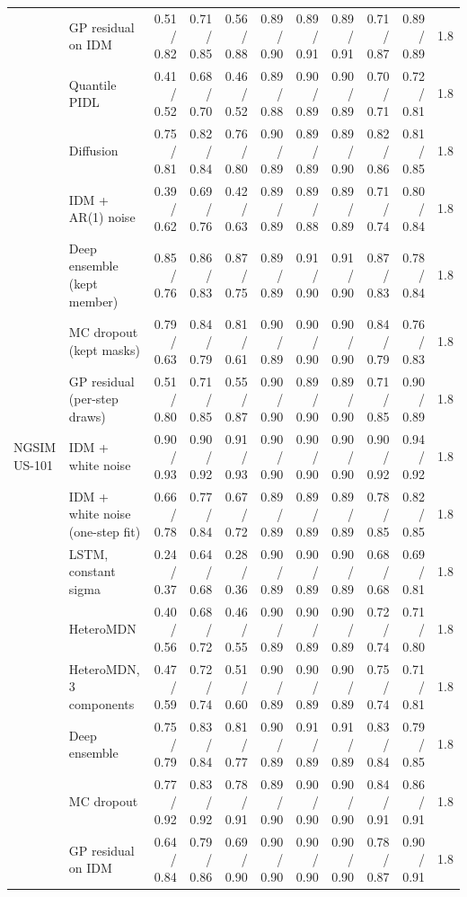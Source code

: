 \begin{longtable}{llrrrrrrrrr}
 & GP residual on IDM & 0.51 / 0.82 & 0.71 / 0.85 & 0.56 / 0.88 & 0.89 / 0.90 & 0.89 / 0.91 & 0.89 / 0.91 & 0.71 / 0.87 & 0.89 / 0.89 & 1.8 \\
 & Quantile PIDL & 0.41 / 0.52 & 0.68 / 0.70 & 0.46 / 0.52 & 0.89 / 0.88 & 0.90 / 0.89 & 0.90 / 0.89 & 0.70 / 0.71 & 0.72 / 0.81 & 1.8 \\
 & Diffusion & 0.75 / 0.81 & 0.82 / 0.84 & 0.76 / 0.80 & 0.90 / 0.89 & 0.89 / 0.89 & 0.89 / 0.90 & 0.82 / 0.86 & 0.81 / 0.85 & 1.8 \\
 & IDM + AR(1) noise & 0.39 / 0.62 & 0.69 / 0.76 & 0.42 / 0.63 & 0.89 / 0.89 & 0.89 / 0.88 & 0.89 / 0.89 & 0.71 / 0.74 & 0.80 / 0.84 & 1.8 \\
 & Deep ensemble (kept member) & 0.85 / 0.76 & 0.86 / 0.83 & 0.87 / 0.75 & 0.89 / 0.89 & 0.91 / 0.90 & 0.91 / 0.90 & 0.87 / 0.83 & 0.78 / 0.84 & 1.8 \\
 & MC dropout (kept masks) & 0.79 / 0.63 & 0.84 / 0.79 & 0.81 / 0.61 & 0.90 / 0.89 & 0.90 / 0.90 & 0.90 / 0.90 & 0.84 / 0.79 & 0.76 / 0.83 & 1.8 \\
 & GP residual (per-step draws) & 0.51 / 0.80 & 0.71 / 0.85 & 0.55 / 0.87 & 0.90 / 0.90 & 0.89 / 0.90 & 0.89 / 0.90 & 0.71 / 0.85 & 0.90 / 0.89 & 1.8 \\
\midrule
NGSIM US-101 & IDM + white noise & 0.90 / 0.93 & 0.90 / 0.92 & 0.91 / 0.93 & 0.90 / 0.90 & 0.90 / 0.90 & 0.90 / 0.90 & 0.90 / 0.92 & 0.94 / 0.92 & 1.8 \\
 & IDM + white noise (one-step fit) & 0.66 / 0.78 & 0.77 / 0.84 & 0.67 / 0.72 & 0.89 / 0.89 & 0.89 / 0.89 & 0.89 / 0.89 & 0.78 / 0.85 & 0.82 / 0.85 & 1.8 \\
 & LSTM, constant sigma & 0.24 / 0.37 & 0.64 / 0.68 & 0.28 / 0.36 & 0.90 / 0.89 & 0.90 / 0.89 & 0.90 / 0.89 & 0.68 / 0.68 & 0.69 / 0.81 & 1.8 \\
 & HeteroMDN & 0.40 / 0.56 & 0.68 / 0.72 & 0.46 / 0.55 & 0.90 / 0.89 & 0.90 / 0.89 & 0.90 / 0.89 & 0.72 / 0.74 & 0.71 / 0.80 & 1.8 \\
 & HeteroMDN, 3 components & 0.47 / 0.59 & 0.72 / 0.74 & 0.51 / 0.60 & 0.90 / 0.89 & 0.90 / 0.89 & 0.90 / 0.89 & 0.75 / 0.74 & 0.71 / 0.81 & 1.8 \\
 & Deep ensemble & 0.75 / 0.79 & 0.83 / 0.84 & 0.81 / 0.77 & 0.90 / 0.89 & 0.91 / 0.89 & 0.91 / 0.89 & 0.83 / 0.84 & 0.79 / 0.85 & 1.8 \\
 & MC dropout & 0.77 / 0.92 & 0.83 / 0.92 & 0.78 / 0.91 & 0.89 / 0.90 & 0.90 / 0.90 & 0.90 / 0.90 & 0.84 / 0.91 & 0.86 / 0.91 & 1.8 \\
 & GP residual on IDM & 0.64 / 0.84 & 0.79 / 0.86 & 0.69 / 0.90 & 0.90 / 0.90 & 0.90 / 0.90 & 0.90 / 0.90 & 0.78 / 0.87 & 0.90 / 0.91 & 1.8 \\

\end{longtable}
